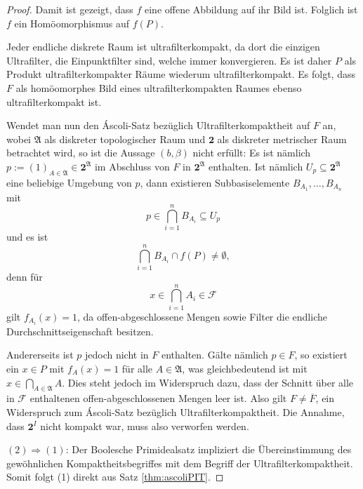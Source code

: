\begin{proof}
  Damit ist gezeigt, dass $f$ eine offene Abbildung auf ihr Bild ist.
  Folglich ist $f$ ein Homöomorphismus auf $f(P)$.

  Jeder endliche diskrete Raum ist ultrafilterkompakt, da dort die einzigen Ultrafilter, die Einpunktfilter sind, welche immer konvergieren.
  Es ist daher $P$ als Produkt ultrafilterkompakter Räume wiederum ultrafilterkompakt.
  Es folgt, dass $F$ als homöomorphes Bild eines ultrafilterkompakten Raumes ebenso ultrafilterkompakt ist.

  Wendet man nun den Áscoli-Satz bezüglich Ultrafilterkompaktheit auf $F$ an, wobei $\mathfrak{A}$ als diskreter topologischer Raum und $\mathbf{2}$ als diskreter metrischer Raum betrachtet wird, so ist die Aussage $(b, \beta)$ nicht erfüllt:
  Es ist nämlich $p := (1)_{A \in \mathfrak{A}} \in \mathbf{2}^\mathfrak{A}$ im Abschluss von $F$ in $\mathbf{2}^\mathfrak{A}$ enthalten.
  Ist nämlich $U_p \subseteq \mathbf{2}^\mathfrak{A}$ eine beliebige Umgebung von $p$, dann existieren Subbasiselemente $B_{A_1},\dots,B_{A_n}$ mit
  \begin{displaymath}
    p \in \bigcap_{i=1}^n B_{A_i} \subseteq U_p
  \end{displaymath}
  und es ist
  \begin{displaymath}
    \bigcap_{i=1}^n B_{A_i} \cap f(P) \neq \emptyset,
  \end{displaymath}
  denn für 
  \begin{displaymath}
    x \in \bigcap_{i=1}^n A_i \in \mathcal{F}
  \end{displaymath}
  gilt $f_{A_i}(x) = 1$, da offen-abgeschlossene Mengen sowie Filter die endliche Durchschnittseigenschaft besitzen.
  
  Andererseits ist $p$ jedoch nicht in $F$ enthalten. 
  Gälte nämlich $p \in F$, so existiert ein $x \in P$ mit $f_A(x) = 1$ für alle $A \in \mathfrak{A}$, was gleichbedeutend ist mit $x \in \bigcap_{A \in \mathfrak{A}} A$.
  Dies steht jedoch im Widerspruch dazu, dass der Schnitt über alle in $\mathcal{F}$ enthaltenen offen-abgeschlossenen Mengen leer ist.
  Also gilt $F \neq \overline{F}$, ein Widerspruch zum Áscoli-Satz bezüglich Ultrafilterkompaktheit.
  Die Annahme, dass $\mathbf{2}^I$ nicht kompakt war, muss also verworfen werden.

  $(2)\Rightarrow(1)$: Der Boolesche Primidealsatz impliziert die Übereinstimmung des gewöhnlichen Kompaktheitsbegriffes mit dem Begriff der Ultrafilterkompaktheit. Somit folgt (1) direkt aus Satz \ref{thm:ascoliPIT}.
\end{proof}


